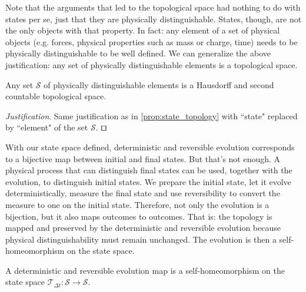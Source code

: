 \documentclass[smallextended]{svjour3}
\numberwithin{equation}{section}
\newenvironment{justification}{\emph{Justification}.}{\hfill\(\qed\)}
\begin{document}
Note that the arguments that led to the topological space had nothing to do with states per se, just that they are physically distinguishable. States, though, are not the only objects with that property. In fact: any element of a set of physical objects (e.g. forces, physical properties such as mass or charge, time) needs to be physically distinguishable to be well defined. We can generalize the above justification: any set of physically distinguishable elements is a topological space.

\begin{prop}\label{prop:topology}
	Any set $\mathcal{S}$ of physically distinguishable elements is a Hausdorff and second countable topological space.
\end{prop}

\begin{justification}
	Same justification as in \ref{prop:state_topology} with ``state" replaced by ``element" of the set $\mathcal{S}$.
\end{justification}

With our state space defined, deterministic and reversible evolution corresponds to a bijective map between initial and final states. But that's not enough. A physical process that can distinguish final states can be used, together with the evolution, to distinguish initial states. We prepare the initial state, let it evolve deterministically, measure the final state and use reversibility to convert the measure to one on the initial state. Therefore, not only the evolution is a bijection, but it also maps outcomes to outcomes. That is: the topology is mapped and preserved by the deterministic and reversible evolution because physical distinguishability must remain unchanged. The evolution is then a self-homeomorphism on the state space.

\begin{prop}\label{prop:homeomorphism}
A deterministic and reversible evolution map is a self-homeomorphism on the state space $\mathcal{T}_{\Delta t}:\mathcal{S} \rightarrow \mathcal{S}$.
\end{prop}
\end{document}
